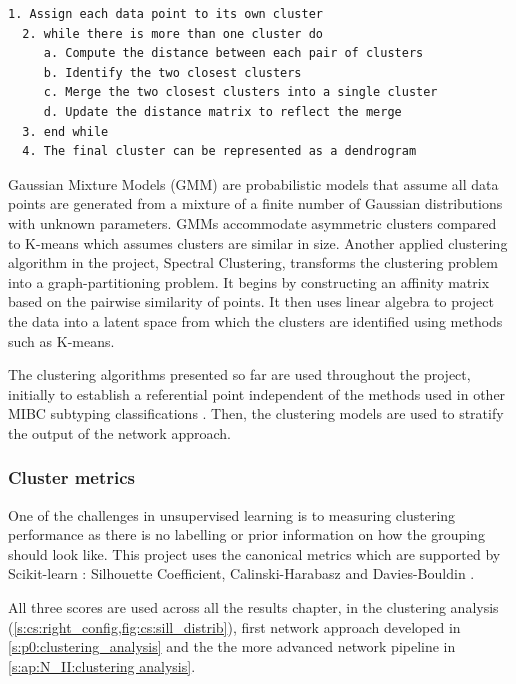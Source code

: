 \begin{lstlisting}[float=!h, caption={Agglomerative hierarchical clustering pseudocode}, label={code:agg_clustering}]
  1. Assign each data point to its own cluster
  2. while there is more than one cluster do
     a. Compute the distance between each pair of clusters
     b. Identify the two closest clusters
     c. Merge the two closest clusters into a single cluster
     d. Update the distance matrix to reflect the merge
  3. end while
  4. The final cluster can be represented as a dendrogram
\end{lstlisting}

Gaussian Mixture Models (GMM) are probabilistic models that assume all data points are generated from a mixture of a finite number of Gaussian distributions with unknown parameters. GMMs accommodate asymmetric clusters compared to K-means which assumes clusters are similar in size. Another applied clustering algorithm in the project, Spectral Clustering, transforms the clustering problem into a graph-partitioning problem. It begins by constructing an affinity matrix based on the pairwise similarity of points. It then uses linear algebra to project the data into a latent space from which the clusters are identified using methods such as K-means.

The clustering algorithms presented so far are used throughout the project, initially to establish a referential point independent of the methods used in other MIBC subtyping classifications \citep{Robertson2017-mg, Marzouka2018-ge, Kamoun2020-tj}. Then, the clustering models are used to stratify the output of the network approach.


\subsubsection*{Cluster metrics} \label{s:lit:clustering_metrics}

One of the challenges in unsupervised learning is to measuring clustering performance as there is no labelling or prior information on how the grouping should look like. This project uses the canonical metrics which are supported by Scikit-learn \citep{Pedregosa2011-ts,Scikit-learn_undated-ax}: Silhouette Coefficient, Calinski-Harabasz and Davies-Bouldin \citep{Rousseeuw1987-wy,Calinski1974-uu,Davies1979-tn}. 

All three scores are used across all the results chapter, in the clustering analysis (\cref{s:cs:right_config,fig:cs:sill_distrib}), first network approach developed in \cref{s:p0:clustering_analysis} and the the more advanced network pipeline in \cref{s:ap:N_II:clustering analysis}.


